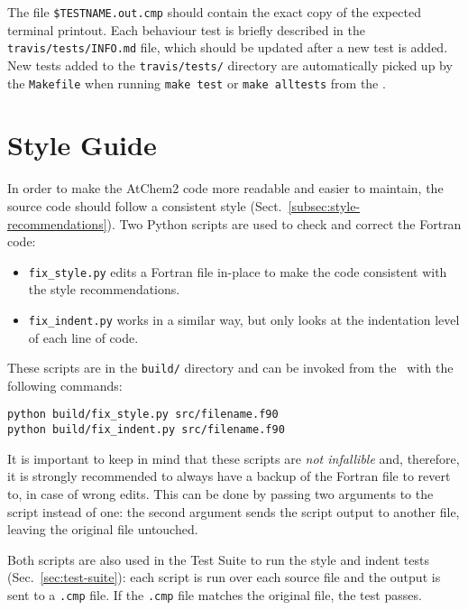 The file \texttt{\$TESTNAME.out.cmp} should contain the exact copy of
the expected terminal printout. Each behaviour test is briefly
described in the \texttt{travis/tests/INFO.md} file, which should be
updated after a new test is added. New tests added to the
\texttt{travis/tests/} directory are automatically picked up by the
\texttt{Makefile} when running \verb|make test| or \verb|make alltests|
from the \maindir.

\section{Style Guide} \label{sec:style-guide}

In order to make the AtChem2 code more readable and easier to
maintain, the source code should follow a consistent style
(Sect.~\ref{subsec:style-recommendations}). Two Python scripts are used
to check and correct the Fortran code:

\begin{itemize}
\item \texttt{fix\_style.py} edits a Fortran file in-place to make the
  code consistent with the style recommendations.
\item \texttt{fix\_indent.py} works in a similar way, but only looks
  at the indentation level of each line of code.
\end{itemize}

These scripts are in the \texttt{build/} directory and can be invoked
from the \maindir\ with the following commands:

\begin{verbatim}
python build/fix_style.py src/filename.f90
python build/fix_indent.py src/filename.f90
\end{verbatim}

It is important to keep in mind that these scripts are \emph{not
  infallible} and, therefore, it is strongly recommended to always
have a backup of the Fortran file to revert to, in case of wrong
edits. This can be done by passing two arguments to the script instead
of one: the second argument sends the script output to another file,
leaving the original file untouched.

Both scripts are also used in the Test Suite to run the style and
indent tests (Sec.~\ref{sec:test-suite}): each script is run over each
source file and the output is sent to a \texttt{.cmp} file. If the
\texttt{.cmp} file matches the original file, the test passes.

